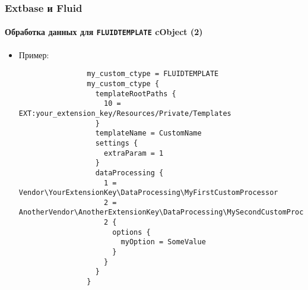 \begin{frame}[fragile]
	\frametitle{Extbase и Fluid}
	\framesubtitle{Обработка данных для \texttt{FLUIDTEMPLATE} cObject (2)}

	\lstset{basicstyle=\tiny\ttfamily}

	\begin{itemize}

		\item Пример:

			\begin{lstlisting}
				my_custom_ctype = FLUIDTEMPLATE
				my_custom_ctype {
				  templateRootPaths {
				    10 = EXT:your_extension_key/Resources/Private/Templates
				  }
				  templateName = CustomName
				  settings {
				    extraParam = 1
				  }
				  dataProcessing {
				    1 = Vendor\YourExtensionKey\DataProcessing\MyFirstCustomProcessor
				    2 = AnotherVendor\AnotherExtensionKey\DataProcessing\MySecondCustomProcessor
				    2 {
				      options {
				        myOption = SomeValue
				      }
				    }
				  }
				}
			\end{lstlisting}

	\end{itemize}

\end{frame}

